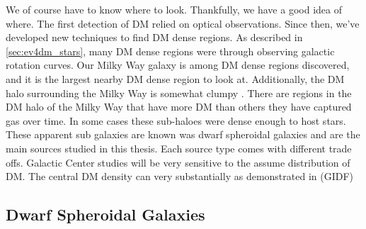 \begin{figure}
\end{figure}

We of course have to know where to look.
Thankfully, we have a good idea of where.
The first detection of DM relied on optical observations.
Since then, we've developed new techniques to find DM dense regions.
As described in \cref{sec:ev4dm_stars}, many DM dense regions were through observing galactic rotation curves.
Our Milky Way galaxy is among DM dense regions discovered, and it is the largest nearby DM dense region to look at.
Additionally, the DM halo surrounding the Milky Way is somewhat clumpy \cite{Tracy:les_houches}.
There are regions in the DM halo of the Milky Way that have more DM than others they have captured gas over time.
In some cases these sub-haloes were dense enough to host stars.
These apparent sub galaxies are known was dwarf spheroidal galaxies and are the main sources studied in this thesis.
Each source type comes with different trade offs.
Galactic Center studies will be very sensitive to the assume distribution of DM.
The central DM density can very substantially as demonstrated in (GIDF)

\subsection{Dwarf Spheroidal Galaxies\label{sec:dSphs}}

